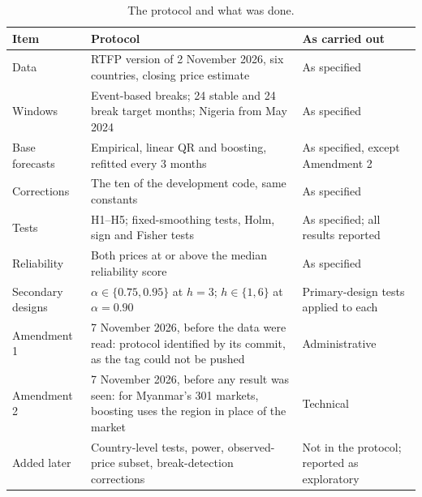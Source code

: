 \begin{table}[t]
\caption{The protocol and what was done.\label{tab:deviations}}
\centering\footnotesize
\begin{tabular*}{\columnwidth}{@{\extracolsep\fill}p{}p{}p{}@{}}
\toprule
\textbf{Item} & \textbf{Protocol} & \textbf{As carried out} \\
\midrule
Data & RTFP version of 2 November 2026, six countries, closing price estimate & As specified \\
Windows & Event-based breaks; 24 stable and 24 break target months; Nigeria from May 2024 & As specified \\
Base forecasts & Empirical, linear QR and boosting, refitted every 3 months & As specified, except Amendment 2 \\
Corrections & The ten of the development code, same constants & As specified \\
Tests & H1--H5; fixed-smoothing tests, Holm, sign and Fisher tests & As specified; all results reported \\
Reliability & Both prices at or above the median reliability score & As specified \\
Secondary designs & $\alpha\in\{0.75,0.95\}$ at $h=3$; $h\in\{1,6\}$ at $\alpha=0.90$ & Primary-design tests applied to each \\
\addlinespace
Amendment 1 & 7 November 2026, before the data were read: protocol identified by its commit, as the tag could not be pushed & Administrative \\
Amendment 2 & 7 November 2026, before any result was seen: for Myanmar's 301 markets, boosting uses the region in place of the market & Technical \\
\addlinespace
Added later & Country-level tests, power, observed-price subset, break-detection corrections & Not in the protocol; reported as exploratory \\
\bottomrule
\end{tabular*}
\end{table}
